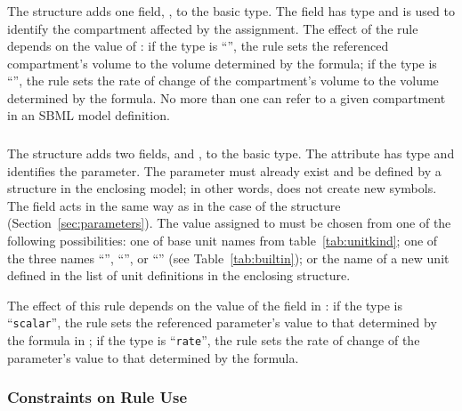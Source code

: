 \documentclass[10pt]{cekarticle}
\newcommand{\changed}[1]{\textcolor{BrickRed}{#1}}
\begin{document}
\subsubsection{}

The  structure adds one field, ,
to the basic  type.  The field 
has type  and is used to identify the compartment affected by
the assignment.  The effect of the rule depends on the value of
: if the type is ``'', the rule sets the
referenced compartment's volume to the volume determined by the formula; if
the type is ``'', the rule sets the rate of change of the
compartment's volume to the volume determined by the formula.
\changed{No more than one  can refer to a
given compartment in an SBML model definition.}


\subsubsection{}
\label{sec:parameterrule}

The  structure adds two fields,  and
, to the basic  type.  The
 attribute has type  and identifies the
parameter.  \changed{The parameter must already exist and be defined by a
  \class{Parameter} structure in the enclosing model; in other words,
  \class{ParameterRule} does not create new symbols.}  The 
field acts in the same way as in the case of the 
structure (Section~\ref{sec:parameters}).  The value assigned to
 must be chosen from one of the following possibilities: one
of base unit names from table~\ref{tab:unitkind}; one of the three names
``'', ``'', or ``''
(see Table~\ref{tab:builtin}); or the name of a new unit defined in the
list of unit definitions in the enclosing  structure.

The effect of this rule depends on the value of the  field in
: if the type is ``\texttt{scalar}'', the rule sets
the referenced parameter's value to that determined by the formula in
; if the type is ``\texttt{rate}'', the rule sets the rate of
change of the parameter's value to that determined by the formula.

\subsubsection{Constraints on Rule Use}
\label{sec:ruleconstraints}
\end{document}
